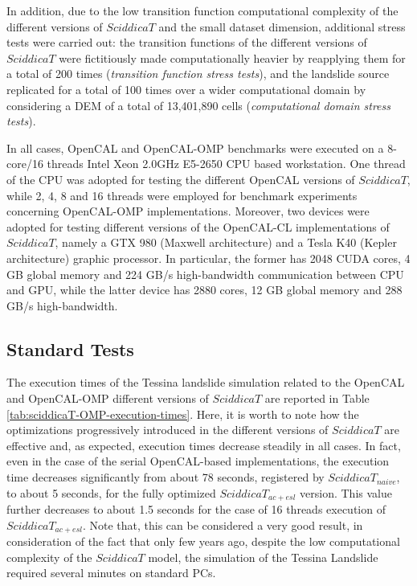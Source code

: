 In addition, due to the low transition function computational
complexity of the different versions of $SciddicaT$ and the small
dataset dimension, additional stress tests were carried out: the
transition functions of the different versions of $SciddicaT$ were
fictitiously made computationally heavier by reapplying them for a
total of 200 times (\emph{transition function stress tests}), and
the landslide source replicated for a total of 100 times over a
wider computational domain by considering a DEM of a total of
13,401,890 cells (\emph{computational domain stress tests}).

In all cases, OpenCAL and OpenCAL-OMP benchmarks were executed on a
8-core/16 threads Intel Xeon 2.0GHz E5-2650 CPU based
workstation. One thread of the CPU was adopted for testing the
different OpenCAL versions of $SciddicaT$, while 2, 4, 8 and 16
threads were employed for benchmark experiments concerning
OpenCAL-OMP implementations. Moreover, two devices were adopted for
testing different versions of the OpenCAL-CL implementations of
$SciddicaT$, namely a GTX 980 (Maxwell architecture) and a Tesla K40
(Kepler architecture) graphic processor. In particular, the former
has 2048 CUDA cores, 4 GB global memory and 224 GB/s high-bandwidth
communication between CPU and GPU, while the latter device has 2880
cores, 12 GB global memory and 288 GB/s high-bandwidth.

\subsection{Standard Tests}
The execution times of the Tessina landslide simulation related to
the OpenCAL and OpenCAL-OMP different versions of $SciddicaT$ are
reported in Table \ref{tab:sciddicaT-OMP-execution-times}. Here,
it is worth to note how the optimizations progressively introduced
in the different versions of $SciddicaT$ are effective and, as
expected, execution times decrease steadily in all cases. In fact,
even in the case of the serial OpenCAL-based implementations, the
execution time decreases significantly from about 78 seconds,
registered by $SciddicaT_{naive}$, to about 5 seconds, for the
fully optimized $SciddicaT_{ac+esl}$ version. This value further
decreases to about 1.5 seconds for the case of 16 threads
execution of $SciddicaT_{ac+esl}$. Note that, this can be
considered a very good result, in consideration of the fact that
only few years ago, despite the low computational complexity of
the $SciddicaT$ model, the simulation of the Tessina Landslide
required several minutes on standard PCs.

